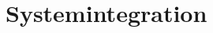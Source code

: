 \documentclass[../main.tex]{subfiles}
\begin{document}
\chapter{Systemintegration} \label{Chap:Systemintegration}
\end{document}
